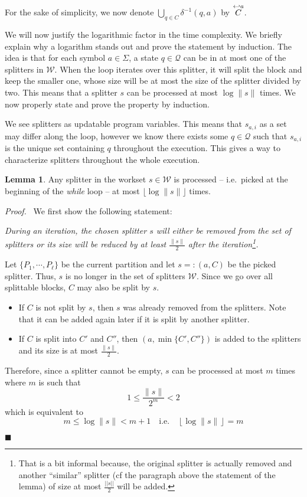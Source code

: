 \documentclass[12pt, a4 paper]{article}
\renewenvironment{proof}[1][Proof]{\begin{mdframed}[backgroundcolor=black!5, topline=false, rightline=false, bottomline=false, linecolor=black!15, linewidth=3pt]{\noindent\textit{#1.}\ }}{\noindent\par\hfill$\blacksquare$\end{mdframed}}
\theoremstyle{definition}
\newtheorem{lemma}{Lemma}
\begin{document}
For the sake of simplicity, we now denote $\displaystyle{\bigcup_{q \in C} \delta^{-1}(q, a)}$ by $\overset{\hookleftarrow {a}}{C}$.

We will now justify the logarithmic factor in the time complexity.
We briefly explain why a logarithm stands out and prove the statement by induction.
The idea is that for each symbol $a \in \Sigma$, a state $q \in \mathcal{Q}$ can be in at most one of the splitters in $\mathcal{W}$.
When the loop iterates over this splitter, it will split the block and keep the smaller one, whose size will be at most the size of the splitter divided by two.
This means that a splitter $s$ can be processed at most $\log \| s \|$ times.
We now properly state and prove the property by induction.

We see splitters as updatable program variables.
This means that $s_{a,i}$ as a set may differ along the loop, however we know there exists some $q \in \mathcal{Q}$ such that $s_{a,i}$ is the unique set containing $q$ throughout the execution.
This gives a way to characterize splitters throughout the whole execution.

\bigskip

\begin{lemma}\label{lem:log}
    Any splitter in the workset $s \in \mathcal{W}$ is processed -- i.e.\ picked at the beginning of the \textit{while} loop -- at most $\lfloor \log \| s \| \rfloor$ times.
\end{lemma}
\begin{proof}
    We first show the following statement:

    \textit{During an iteration, the chosen splitter $s$ will either be removed from the set of splitters or its size will be reduced by at least $\frac{\| s\|}{2}$ after the iteration\footnote{That is a bit informal because, the original splitter is actually removed and another ``similar'' splitter (cf the paragraph above the statement of the lemma) of size at most $\frac{||s||}{2}$ will be added.}.}

    \bigskip
    Let $\{P_1, \cdots, P_\ell\}$ be the current partition and let $s =: (a, C)$ be the picked splitter. Thus, $s$ is no longer in the set of splitters $\mathcal{W}$. Since we go over all splittable blocks, $C$ may also be split by $s$.
    \begin{itemize}
        \item If $C$ is not split by $s$, then $s$ was already removed from the splitters. Note that it can be added again later if it is split by another splitter.
        \item If $C$ is split into $C'$ and $C''$, then $(a, \min\{C', C''\})$ is added to the splitters and its size is at most $\frac{\| s \|}{2}$.
    \end{itemize}
    Therefore, since a splitter cannot be empty, $s$ can be processed at most $m$ times where $m$ is such that
    $$ 1 \leq \frac{\| s \|}{2^m} < 2$$
    which is equivalent to
    $$ m \leq \log \| s \| < m + 1 \quad \text{i.e.}\quad \left\lfloor\log \| s \|\right\rfloor = m $$
\end{proof}
\end{document}
